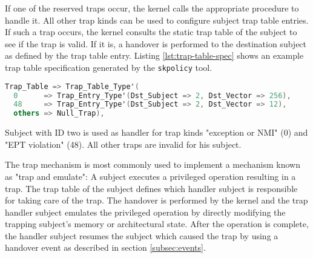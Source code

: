 If one of the reserved traps occur, the kernel calls the appropriate procedure
to handle it. All other trap kinds can be used to configure subject trap table
entries. If such a trap occurs, the kernel consults the static trap table of the
subject to see if the trap is valid. If it is, a handover is performed to the
destination subject as defined by the trap table entry. Listing
\ref{lst:trap-table-spec} shows an example trap table specification generated by
the \texttt{skpolicy} tool.

\begin{lstlisting}[language=Ada, label=lst:trap-table-spec, caption=Trap table specification]
Trap_Table => Trap_Table_Type'(
  0      => Trap_Entry_Type'(Dst_Subject => 2, Dst_Vector => 256),
  48     => Trap_Entry_Type'(Dst_Subject => 2, Dst_Vector => 12),
  others => Null_Trap),
\end{lstlisting}

Subject with ID two is used as handler for trap kinds "exception or
NMI" (0) and "EPT violation" (48). All other traps are invalid for
his subject.

The trap mechanism is most commonly used to implement a mechanism known as "trap
and emulate": A subject executes a privileged operation resulting in a trap. The
trap table of the subject defines which handler subject is responsible for
taking care of the trap. The handover is performed by the kernel and the trap
handler subject emulates the privileged operation by directly modifying the
trapping subject's memory or architectural state. After the operation is
complete, the handler subject resumes the subject which caused the trap by using
a handover event as described in section \ref{subsec:events}.
